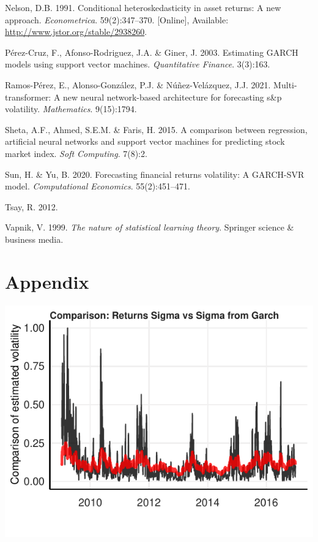 \documentclass[11pt,preprint, authoryear]{elsarticle}
\let\origfigure\figure
\let\endorigfigure\endfigure
\renewenvironment{figure}[1][2] {
    \expandafter\origfigure\expandafter[H]
} {
    \endorigfigure
}
\numberwithin{equation}{section}
\numberwithin{figure}{section}
\numberwithin{table}{section}
\newlength{\cslhangindent}
\newenvironment{CSLReferences}%
  {\setlength{\parindent}{0pt}%
  \everypar{\setlength{\hangindent}{\cslhangindent}}\ignorespaces}%
  {\par}
\begin{document}
\begin{CSLReferences}{1}{0}
\leavevmode\hypertarget{ref-nelson}{}%
Nelson, D.B. 1991. Conditional heteroskedasticity in asset returns: A
new approach. \emph{Econometrica}. 59(2):347--370. {[}Online{]},
Available: \url{http://www.jstor.org/stable/2938260}.

\leavevmode\hypertarget{ref-svr_garch}{}%
Pérez-Cruz, F., Afonso-Rodriguez, J.A. \& Giner, J. 2003. Estimating
GARCH models using support vector machines. \emph{Quantitative Finance}.
3(3):163.

\leavevmode\hypertarget{ref-vol-transformer}{}%
Ramos-Pérez, E., Alonso-González, P.J. \& Núñez-Velázquez, J.J. 2021.
Multi-transformer: A new neural network-based architecture for
forecasting s\&p volatility. \emph{Mathematics}. 9(15):1794.

\leavevmode\hypertarget{ref-ann}{}%
Sheta, A.F., Ahmed, S.E.M. \& Faris, H. 2015. A comparison between
regression, artificial neural networks and support vector machines for
predicting stock market index. \emph{Soft Computing}. 7(8):2.

\leavevmode\hypertarget{ref-svr-GARCH}{}%
Sun, H. \& Yu, B. 2020. Forecasting financial returns volatility: A
GARCH-SVR model. \emph{Computational Economics}. 55(2):451--471.

\leavevmode\hypertarget{ref-tsay}{}%
Tsay, R. 2012.

\leavevmode\hypertarget{ref-vapnik}{}%
Vapnik, V. 1999. \emph{The nature of statistical learning theory}.
Springer science \& business media.

\end{CSLReferences}

\hypertarget{appendix}{%
\section*{Appendix}\label{appendix}}

\begin{figure}[H]

{\centering \includegraphics{Essay_files/figure-latex/plot_1-1} 

}

\caption{EGARCH(1,1) One-Day Ahead Training Forecast}\label{fig:plot_1}
\end{figure}
\end{document}
